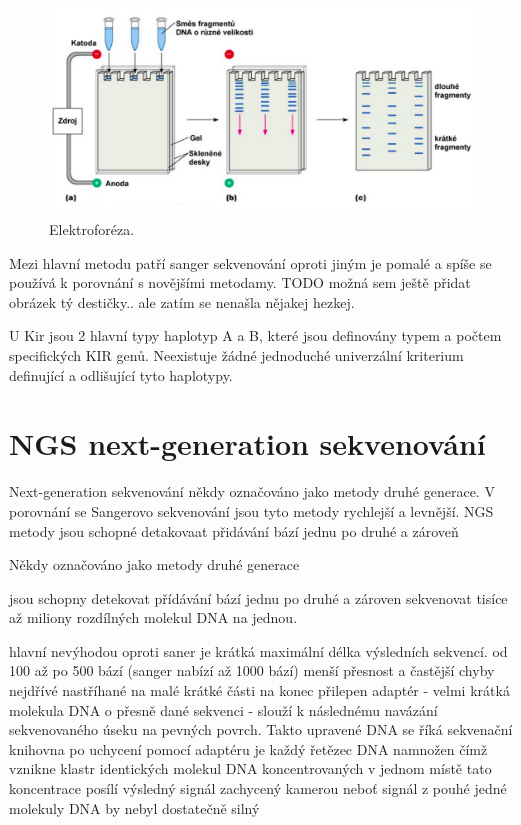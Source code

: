 \documentclass[czech,DP]{thesiskiv}
\begin{document}
\begin{figure}[H]		
		\centering
		\includegraphics[width=\textwidth]{./img/elektroforeza.png}
		\caption{Elektroforéza. \cite{elektroforeza_img}}
		\label{fig:elektroforeza}
\end{figure}



 Mezi hlavní metodu patří sanger sekvenování oproti jiným je pomalé a spíše se používá k porovnání s novějšími metodamy. 
TODO možná sem ještě přidat obrázek tý destičky.. ale zatím se nenašla nějakej hezkej.

U Kir jsou 2 hlavní typy haplotyp A a B, které jsou definovány typem a počtem specifických KIR genů. Neexistuje žádné jednoduché univerzální kriterium definující a odlišující tyto haplotypy. 


 
 
\section{NGS next-generation sekvenování}
Next-generation sekvenování někdy označováno jako metody druhé generace. V porovnání se Sangerovo sekvenování jsou tyto metody rychlejší a levnější. NGS metody jsou schopné detakovaat přidávání bází jednu po druhé a zároveň  


Někdy označováno jako metody druhé generace
 
jsou schopny detekovat přídávání bází jednu po druhé a zároven sekvenovat tisíce až miliony rozdílných molekul DNA na jednou. 

hlavní nevýhodou oproti saner je krátká maximální délka výsledních sekvencí. od 100 až po 500 bází (sanger nabízí až 1000 bází)
menší přesnost a častější chyby
nejdřívé nastříhané na malé krátké části na konec přilepen adaptér - velmi krátká molekula DNA o přesně dané sekvenci
- slouží k následnému navázání sekvenovaného úseku na pevných povrch. Takto upravené DNA se říká sekvenační knihovna
po uchycení pomocí adaptéru je každý řetězec DNA namnožen čímž vznikne klastr identických molekul DNA koncentrovaných v jednom místě
tato koncentrace posílí výsledný signál zachycený kamerou neboť signál z pouhé jedné molekuly DNA by nebyl dostatečně silný
 
\end{document}
